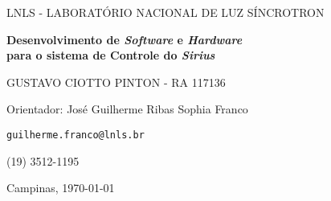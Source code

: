 \newcommand{\namesigdate}[2][8cm]{%
  \begin{tabular}{@{}p{#1}}
    \\[1\normalbaselineskip] \hrule \\[0pt]
    {\small \textit{#2}} \\[1\normalbaselineskip]
  \end{tabular}
}

\begin{center}


\vspace*{12pt}

LNLS - LABORATÓRIO NACIONAL DE LUZ SÍNCROTRON

\vspace*{.25\textheight}

\vspace*{72pt}
\textbf{\Large Desenvolvimento de \textit{Software} e \textit{Hardware} \\ para
o sistema de Controle do \textit{Sirius}} \\ \vspace{12pt}

\vspace*{72pt}

{\Large GUSTAVO CIOTTO PINTON  - RA 117136}

\vspace{12pt}

Orientador: José Guilherme Ribas Sophia Franco

\texttt{guilherme.franco@lnls.br}

(19) 3512-1195



\vspace{226pt}
 
Campinas, \today

\end{center}

\newpage 
